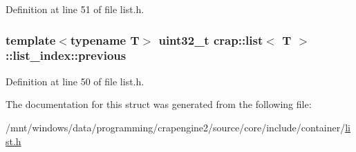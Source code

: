Definition at line 51 of file list.\+h.

\hypertarget{structcrap_1_1list_1_1list__index_a16be27e9969e8256df96367d8de4c325}{}
\subsubsection[{previous}]{\setlength{\rightskip}{0pt plus 5cm}template$<$typename T$>$ uint32\+\_\+t {\bf crap\+::list}$<$ T $>$\+::list\+\_\+index\+::previous}\label{structcrap_1_1list_1_1list__index_a16be27e9969e8256df96367d8de4c325}


Definition at line 50 of file list.\+h.



The documentation for this struct was generated from the following file\+:\begin{DoxyCompactItemize}
\item 
/mnt/windows/data/programming/crapengine2/source/core/include/container/\hyperlink{list_8h}{list.\+h}\end{DoxyCompactItemize}
